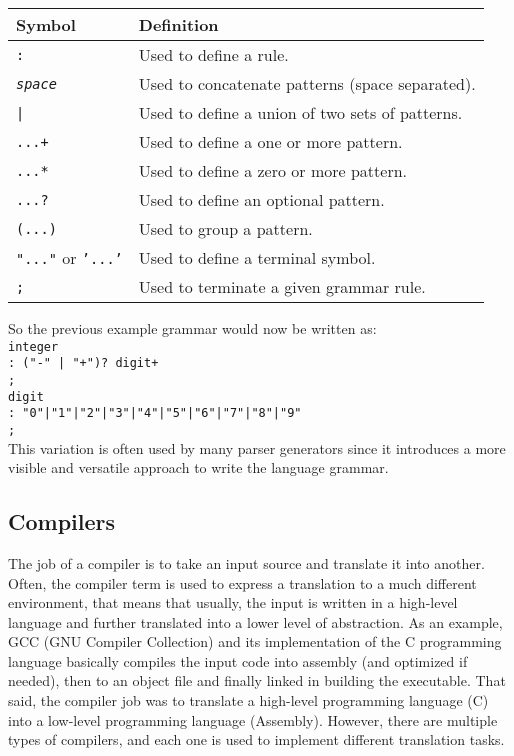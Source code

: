 \begin{center}
    \begin{tabular}{ | l | p{10cm} |}
    \hline
    \textbf{Symbol} & \textbf{Definition} \\ \hline
    \texttt{:} & Used to define a rule. \\ \hline
    \texttt{\textit{space}} & Used to concatenate patterns (space separated). \\ \hline
    \texttt{|} & Used to define a union of two sets of patterns. \\ \hline
    \texttt{...+} & Used to define a one or more pattern. \\ \hline
    \texttt{...*} & Used to define a zero or more pattern. \\ \hline
    \texttt{...?} & Used to define an optional pattern. \\ \hline
    \texttt{(...)} & Used to group a pattern. \\ \hline
    \texttt{"..."} or \texttt{'...'} & Used to define a terminal symbol. \\ \hline
    \texttt{;} & Used to terminate a given grammar rule. \\ \hline
    \end{tabular}
\end{center}

So the previous example grammar would now be written as:\\

\texttt{integer\\\tab: ("-" | "+")? digit+\\\tab;}\\
\texttt{digit\\\tab: "0"|"1"|"2"|"3"|"4"|"5"|"6"|"7"|"8"|"9"\\\tab;}\\

This variation is often used by many parser generators since it introduces a more visible and versatile approach to
write the language grammar.

\subsection{Compilers}

The job of a compiler is to take an input source and translate it into another. Often, the compiler term is used to express
a translation to a much different environment, that means that usually, the input is written in a high-level language and further
translated into a lower level of abstraction. As an example, GCC (GNU Compiler Collection) and its implementation of the C programming
language basically compiles the input code into assembly (and optimized if needed), then to an object file and finally linked
in building the executable. That said, the compiler job was to translate a high-level programming language (C) into a low-level programming
language (Assembly). However, there are multiple types of compilers, and each one is used to implement different translation tasks.

